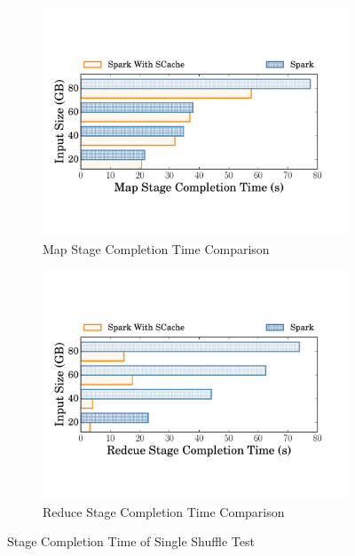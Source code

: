 \begin{figure}
	\begin{subfigure}{\linewidth}
		\centering
		\includegraphics[width=0.9\linewidth]{fig/groupbymapstage}
		\caption{Map Stage Completion Time Comparison}
		\label{fig:mapstage}
	\end{subfigure}
	\begin{subfigure}{\linewidth}
		\centering
		\includegraphics[width=0.9\linewidth]{fig/groupbyreducestage}
		\caption{Reduce Stage Completion Time Comparison}
		\label{fig:reducestage}
	\end{subfigure}
	\caption{Stage Completion Time of Single Shuffle Test}
	\label{fig:singleshuffle}
\end{figure}

